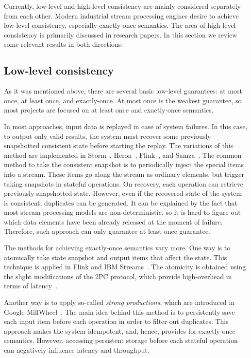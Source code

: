\label{fs-phd-related}

Currently, low-level and high-level consistency are mainly considered separately from each other. Modern industrial stream processing engines desire to achieve low-level consistency, especially exactly-once semantics. The area of high-level consistency is primarily discussed in research papers. In this section we review some relevant results in both directions. 

\subsection{Low-level consistency}
As it was mentioned above, there are several basic low-level guarantees: at most once, at least once, and exactly-once. At most once is the weakest guarantee, so most projects are focused on at least once and exactly-once semantics.

In most approaches, input data is replayed in case of system failures. In this case, to output only valid results, the system must recover some previously snapshotted consistent state before starting the replay. The variations of this method are implemented in Storm~\cite{apache:storm}, Heron~\cite{Kulkarni:2015:THS:2723372.2742788}, Flink~\cite{Carbone:2017:SMA:3137765.3137777}, and Samza~\cite{Noghabi:2017:SSS:3137765.3137770}. The common method to take the consistent snapshot is to periodically inject the special items into a stream. These items go along the stream as ordinary elements, but trigger taking snapshots in stateful operations. On recovery, each operation can retrieve previously snapshotted state. However, even if the recovered state of the system is consistent, duplicates can be generated. It can be explained by the fact that most stream processing models are non-deterministic, so it is hard to figure out which data elements have been already released at the moment of failure. Therefore, such approach can only guarantee at least once guarantee. 

The methods for achieving exactly-once semantics vary more. One way is to atomically take state snapshot and output items that affect the state. This technique is applied in Flink and IBM Streams~\cite{jacques2016consistent}. The atomicity is obtained using the slight modifications of the 2PC protocol, which provide high-overhead in terms of latency~\cite{we2018beyondmr}.

Another way is to apply so-called {\em strong productions}, which are introduced in Google MillWheel~\cite{Akidau:2013:MFS:2536222.2536229}. The main idea behind this method is to persistently save each input item before each operation in order to filter out duplicates. This approach makes the system idempotent, and, hence, provides for exactly-once semantics. However, accessing persistent storage before each stateful operation can negatively influence latency and throughput.


